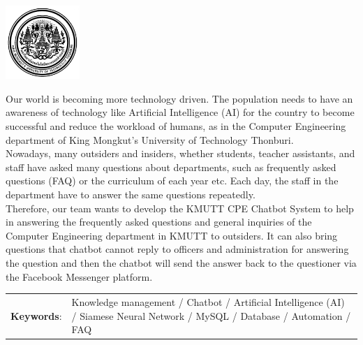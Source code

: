 \documentclass[12pt,oneside,openright,a4paper]{cpe-english-project}
\begin{document}
\pdfstringdefDisableCommands{%
\let\MakeUppercase\relax
}
\begin{center}
  \includegraphics[width=2.8cm]{./img/cover/logo02.jpg}
\end{center}
\vspace*{-1cm}

\maketitlepage
\makesignaturepage 

\abstract

Our world is becoming more technology driven. The population needs to have an awareness of technology 
like Artificial Intelligence (AI) for the country to become successful and reduce the workload of humans, as 
in the Computer Engineering department of King Mongkut’s University of Technology Thonburi. \\
Nowadays, many outsiders and insiders, whether students, teacher assistants, and staff have asked many 
questions about departments, such as frequently asked questions (FAQ) or the curriculum of each year etc. 
Each day, the staff in the department have to answer the same questions repeatedly. \\
Therefore, our team wants to develop the KMUTT CPE Chatbot System to help in answering the frequently 
asked questions and general inquiries of the Computer Engineering department in KMUTT to outsiders. It 
can also bring questions that chatbot cannot reply to officers and administration for answering the question 
and then the chatbot will send the answer back to the questioner via the Facebook Messenger platform.

\begin{flushleft}
\begin{tabular*}{\textwidth}{@{}lp{}}
\textbf{Keywords}: & Knowledge management / Chatbot / Artificial Intelligence (AI) / Siamese Neural Network / MySQL / Database / Automation / FAQ
\end{tabular*}
\end{flushleft}
\endabstract
\end{document}
